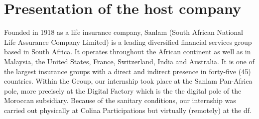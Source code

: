 
\section{Presentation of the host company}
Founded in 1918 as a life insurance company, Sanlam (South African National Life Assurance Company Limited) is a leading diversified financial services group based in South Africa. It operates throughout the African continent as well as in Malaysia, the United States, France, Switzerland, India and Australia. It is one of the largest insurance groups with a direct and indirect presence in forty-five (45) countries. Within the Group, our internship took place at the Sanlam Pan-Africa pole, more precisely at the Digital Factory which is the the digital pole of the Moroccan subsidiary. Because of the sanitary conditions, our internship was carried out physically at Colina Participations but virtually (remotely) at the \acrshort{df}.



